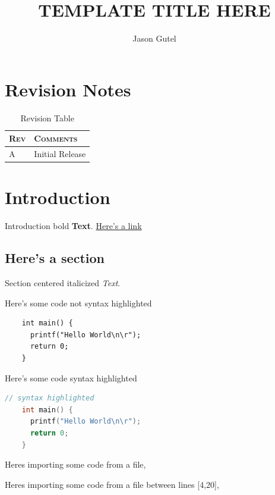 \documentclass[oneside,english,chapters]{smireport}
\author{Jason Gutel}
\newcommand{\titletext}{TEMPLATE TITLE HERE}
\providecommand{\tabularnewline}{\\}
\begin{document}
\renewcommand\HeaderTitle{\titletext}{}

\renewcommand\DocNumber{9XXXX-Y}{}

\renewcommand\DocRev{A}{}

\renewcommand\SVNRevision{\$Rev\$}{}

\renewcommand\TitleBlockTitleLineOne{\titletext}{}

\renewcommand\TitleBlockTitleLineTwo{TEMPLATE Title Line 2}{}

\title{\titletext}

\maketitle
\tableofcontents{}

\listoffigures

\listoftables

\chapter{Revision Notes}
\begin{table}[H]
  \begin{tabular}{|>{\centering}p{}|>{\centering}p{}|}
    \hline
    \textbf{\textsc{Rev}} & \textbf{\textsc{Comments}}\tabularnewline
    \hline
    \hline
    A & Initial Release\tabularnewline
    \hline
  \end{tabular}
  \caption{Revision Table}\label{tab:revision-table}
\end{table}



\chapter{Introduction}
Introduction bold \textbf{Text}.
\newline
\href{https://github.com/gutelfuldead/dotfiles}{Here's a link}

\section{Here's a section}
\begin{center}Section centered italicized \textit{Text}.\end{center}
Here's some code not syntax highlighted
\begin{verbatim}
    int main() {
      printf("Hello World\n\r");
      return 0;
    }
\end{verbatim}
Here's some code syntax highlighted
\begin{lstlisting}[language=C]
    // syntax highlighted
    int main() {
      printf("Hello World\n\r");
      return 0;
    }
\end{lstlisting}
Heres importing some code from a file,

Heres importing some code from a file between lines [4,20],

\end{document}
